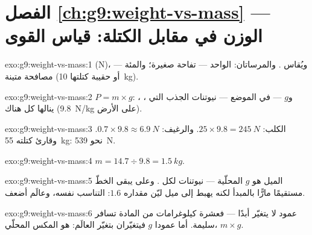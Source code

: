 \section*{الفصل \ref{ch:g9:weight-vs-mass} --- الوزن في مقابل الكتلة: قياس القوى}

\begin{solution}{exo:g9:weight-vs-mass:1}
 (\unit{N})، ويُقاس . والمرساتان: 
الواحد ---  تفاحة صغيرة؛ والمئة --- مصافحة متينة (أو 
حقيبة كتلتها \qty{10}{kg}).
\end{solution}

\begin{solution}{exo:g9:weight-vs-mass:2}
$P = m \times g$:  ،  ، و$g$
---  في الموضع --- نيوتنات الجذب التي ينالها كل
 هناك (\qty{9.8}{N/kg} على الأرض).
\end{solution}

\begin{solution}{exo:g9:weight-vs-mass:3}
الكلب: $25 \times 9.8 = \qty{245}{N}$. والرغيف: $0.7 \times
9.8 \approx \qty{6.9}{N}$. وقارئ كتلته \qty{55}{kg}: نحو
\qty{539}{N}.
\end{solution}

\begin{solution}{exo:g9:weight-vs-mass:4}
$m = 14.7 \div 9.8 = \qty{1.5}{kg}$.
\end{solution}

\begin{solution}{exo:g9:weight-vs-mass:5}
الميل هو $g$ المحلّية --- نيوتنات لكل . وعلى 
يبقى الخطّ مستقيمًا مارًّا بالمبدأ لكنه يهبط إلى ميل ليّن
مقداره $1.6$: التناسب نفسه، وعالَم أضعف.
\end{solution}

\begin{solution}{exo:g9:weight-vs-mass:6}
عمود  لا يتغيّر أبدًا --- فعشرة كيلوغرامات من المادة
تسافر سليمة. أما عمودا $g$  فيتغيّران بتغيّر العالَم:
 هو المكس المحلّي، $m \times g$.
\end{solution}

